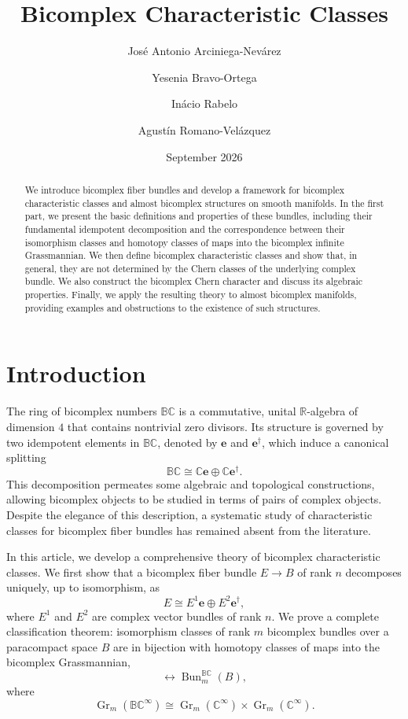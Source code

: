 \documentclass[11pt]{amsart}
\title{Bicomplex Characteristic Classes}
\author[Arciniega-Nevárez]{José Antonio Arciniega-Nevárez}
\author[Bravo-Ortega]{Yesenia Bravo-Ortega}
\author[Rabelo]{Inácio Rabelo}
\author[Romano-Velázquez]{Agustín Romano-Velázquez}
\date{September 2026}
\newcommand{\BC}{\mathbb{BC}}       %
\newcommand{\C}{\mathbb{C}}          %
\newcommand{\R}{\mathbb{R}}
\newcommand{\e}{\mathbf{e}}          %
\newcommand{\ed}{\mathbf{e}^\dagger} %
\theoremstyle{definition}
\begin{document}
\begin{abstract}
    We introduce bicomplex fiber bundles and develop a framework for bicomplex characteristic classes and almost bicomplex structures on smooth manifolds. In the first part, we present the basic definitions and properties of these bundles, including their fundamental idempotent decomposition and the correspondence between their isomorphism classes and homotopy classes of maps into the bicomplex infinite Grassmannian. We then define bicomplex characteristic classes and show that, in general, they are not determined by the Chern classes of the underlying complex bundle. We also construct the bicomplex Chern character and discuss its algebraic properties. Finally, we apply the resulting theory to almost bicomplex manifolds, providing examples and obstructions to the existence of such structures.
\end{abstract}

\maketitle

\section{Introduction}

The ring of bicomplex numbers $\BC$ is a commutative, unital $\R$-algebra of dimension $4$ that contains nontrivial zero divisors. Its structure is governed by two idempotent elements in $\BC$, denoted by $\e$ and $\ed$, which induce
a canonical splitting
\begin{equation*}
\BC\cong\C\mathbf{e}\oplus\C\ed.
\end{equation*}
This decomposition permeates some algebraic and topological
constructions, allowing bicomplex objects to be studied in terms of
pairs of complex objects. Despite the elegance of this description, a
systematic study of characteristic classes for bicomplex fiber bundles
has remained absent from the literature.

In this article, we develop a comprehensive theory of bicomplex
characteristic classes. We first show that a bicomplex fiber bundle
$E\to B$ of rank $n$ decomposes uniquely, up to isomorphism, as
\begin{equation*}
E\cong E^{1}\mathbf{e}\oplus E^{2}\ed,
\end{equation*}
where $E^{1}$ and $E^{2}$ are complex vector bundles of rank $n$.
We prove a complete classification theorem: isomorphism classes of
rank $m$ bicomplex bundles over a paracompact space $B$ are in
bijection with homotopy classes of maps into the bicomplex
Grassmannian,
\begin{equation*}
[B,\operatorname{Gr}_{m}(\BC^{\infty})]
\longleftrightarrow
\operatorname{Bun}_{m}^{\BC}(B),
\end{equation*}
where
\begin{equation*}
\operatorname{Gr}_{m}(\BC^{\infty})
\cong
\operatorname{Gr}_{m}(\C^{\infty})\times
\operatorname{Gr}_{m}(\C^{\infty}).
\end{equation*}
\end{document}
